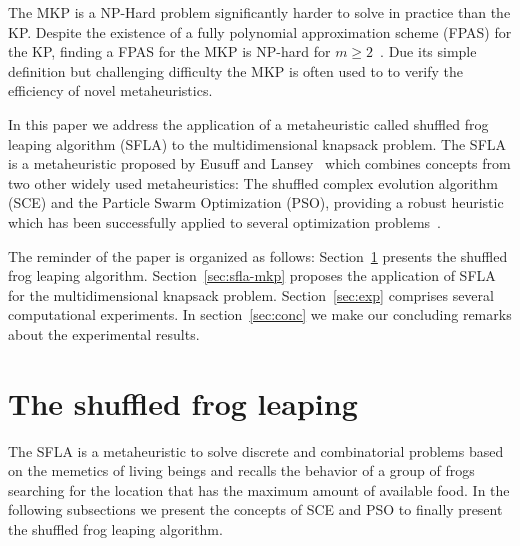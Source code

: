 \documentclass[conference, compsocconf]{IEEEtran}
\begin{document}
The MKP is a NP-Hard problem significantly harder to solve in practice than the KP.
Despite the existence of a fully polynomial approximation scheme (FPAS) for the KP,
finding a FPAS for the MKP is NP-hard for $m \geqslant 2$~\cite{magazine1984note}.
Due its simple definition but challenging difficulty the MKP is often used to
to verify the efficiency of novel metaheuristics.


In this paper we address the application of a metaheuristic called shuffled
frog leaping algorithm (SFLA) to the multidimensional knapsack problem.
The SFLA is a metaheuristic proposed by Eusuff and Lansey~\cite{eusuff2003optimization, eusuff2006shuffled}
which combines concepts from two other widely used metaheuristics:
The shuffled complex evolution algorithm (SCE) and the 
Particle Swarm Optimization (PSO), providing a robust heuristic which has been
successfully applied to several optimization problems~\cite{bhattacharjee2014shuffled,
horng2014construction, xu2013effective, fang2012effective, luo2014improved}.

The reminder of the paper is organized as follows:
Section~\ref{sec:sfla} presents the shuffled frog leaping algorithm.
Section~\ref{sec:sfla-mkp} proposes the application of SFLA for the multidimensional
knapsack problem.
Section~\ref{sec:exp} comprises several computational experiments.
In section~\ref{sec:conc} we make our concluding remarks about the experimental
results.

\section{The shuffled frog leaping}
\label{sec:sfla}

The SFLA is a metaheuristic to solve discrete and combinatorial problems
based on the memetics of living beings and recalls the behavior of a
group of frogs searching for the location that has the maximum amount of available food.
In the following subsections we present the concepts of SCE and PSO to finally
present the shuffled frog leaping algorithm.
\end{document}

